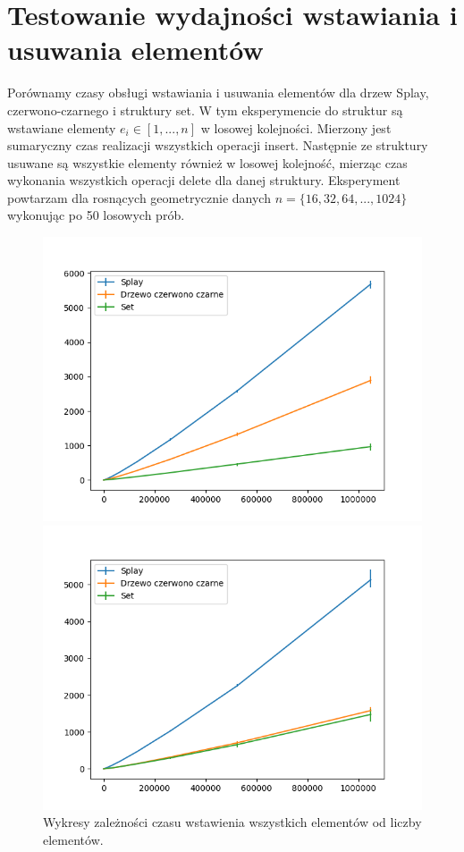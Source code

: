 \documentclass[declaration,shortabstract]{iithesis}
\theoremstyle{thm}
\theoremstyle{remark}
\theoremstyle{plain}
\theoremstyle{plain}
\theoremstyle{plain}
\begin{document}
\section{Testowanie wydajności wstawiania i usuwania elementów}
Porównamy czasy obsługi wstawiania i usuwania elementów dla drzew Splay, czerwono-czarnego i struktury set. W tym eksperymencie do struktur są wstawiane elementy \(e_i \in [1, ..., n]\) w losowej kolejności. Mierzony jest sumaryczny czas realizacji wszystkich operacji insert. Następnie ze struktury usuwane są wszystkie elementy również w losowej kolejność, mierząc czas wykonania wszystkich operacji delete dla danej struktury. Eksperyment powtarzam dla rosnących geometrycznie danych \( n = \{16, 32, 64, ..., 1024\}\) wykonując po 50 losowych prób. \\
\begin{figure}[ht]
\begin{minipage}[b]{.45\textwidth}
\centering
\includegraphics[width=1\textwidth]{wykresy/inserts.png}
\caption{Wykresy zależności czasu wstawienia wszystkich elementów od liczby elementów. }
\end{minipage}
\hfill
\begin{minipage}[b]{.45\textwidth}
\centering
\includegraphics[width=1\textwidth]{wykresy/deletes.png}

\end{minipage}
\end{figure}
\end{document}
